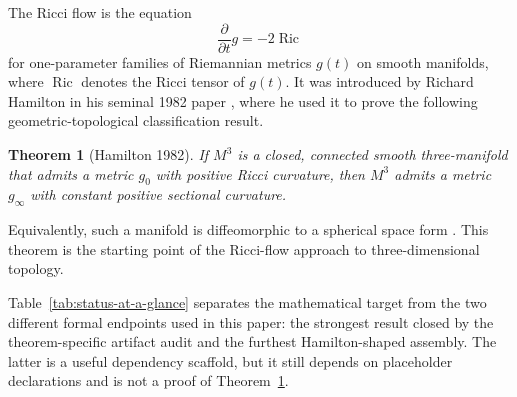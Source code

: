 \documentclass[11pt]{article}
\theoremstyle{plain}
\newtheorem{theorem}{Theorem}[section]
\theoremstyle{definition}
\theoremstyle{remark}
\newcommand{\Ric}{\operatorname{Ric}}
\begin{document}
The Ricci flow is the equation
\begin{equation}
    \frac{\partial}{\partial t} g = - 2 \Ric
\end{equation}
for one-parameter families of Riemannian metrics $g(t)$ on smooth manifolds, where $\Ric$ denotes the Ricci tensor of $g(t)$.
It was introduced by Richard Hamilton in his seminal 1982 paper
\cite{MR664497}, where he used it to prove the following geometric-topological classification
result.
\begin{theorem}[Hamilton 1982]
\label{thm:main-hamilton-3d}
   If $M^3$ is a closed, connected smooth three-manifold that admits a metric
   $g_0$ with positive Ricci curvature, then $M^3$ admits a metric $g_\infty$
   with constant positive sectional curvature.
\end{theorem}
Equivalently, such a manifold is diffeomorphic to a spherical space form
\cite{MR2742530}.  This
theorem is the starting point of the Ricci-flow approach to
three-dimensional topology.

Table~\ref{tab:status-at-a-glance} separates the mathematical target from the
two different formal endpoints used in this paper: the strongest result
closed by the theorem-specific artifact audit and the furthest Hamilton-shaped
assembly.  The latter is a useful dependency scaffold, but it
still depends on placeholder declarations and is not a proof of
Theorem~\ref{thm:main-hamilton-3d}.
\end{document}
